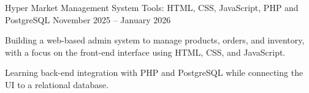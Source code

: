 \resumeProject
    {Hyper Market Management System}
    {Tools: HTML, CSS, JavaScript, PHP and PostgreSQL}
    {November 2025 -- January 2026}
    {{} }
    \resumeItemListStart
      \item Building a web-based admin system to manage products, orders, and inventory, with a focus on the front-end interface using HTML, CSS, and JavaScript.
      \item Learning back-end integration with PHP and PostgreSQL while connecting the UI to a relational database.
    \resumeItemListEnd
